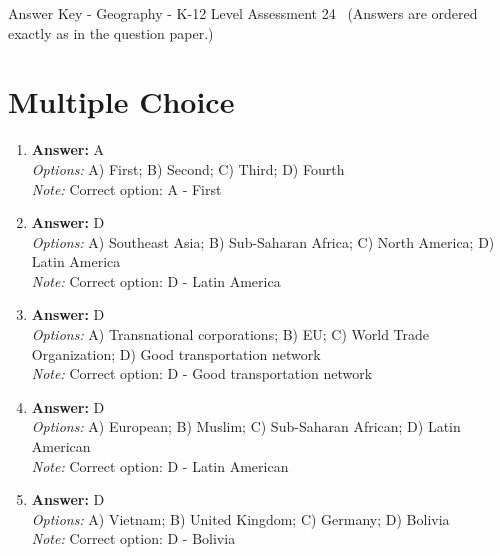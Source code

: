 \documentclass[12pt]{article}
\begin{document}
\begin{center}
Answer Key - Geography - K-12 Level Assessment 24 \
\small (Answers are ordered exactly as in the question paper.)
\end{center}

\section*{Multiple Choice}
\begin{enumerate}[label=\arabic*.]
\item \textbf{Answer:} A
\\ \textit{Options:} A) First; B) Second; C) Third; D) Fourth
\\ \textit{Note:} Correct option: A - First
\item \textbf{Answer:} D
\\ \textit{Options:} A) Southeast Asia; B) Sub-Saharan Africa; C) North America; D) Latin America
\\ \textit{Note:} Correct option: D - Latin America
\item \textbf{Answer:} D
\\ \textit{Options:} A) Transnational corporations; B) EU; C) World Trade Organization; D) Good transportation network
\\ \textit{Note:} Correct option: D - Good transportation network
\item \textbf{Answer:} D
\\ \textit{Options:} A) European; B) Muslim; C) Sub-Saharan African; D) Latin American
\\ \textit{Note:} Correct option: D - Latin American
\item \textbf{Answer:} D
\\ \textit{Options:} A) Vietnam; B) United Kingdom; C) Germany; D) Bolivia
\\ \textit{Note:} Correct option: D - Bolivia
\end{enumerate}
\end{document}
